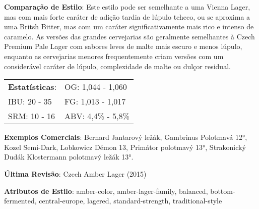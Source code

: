 \textbf{Comparação de Estilo}: Este estilo pode ser semelhante a uma Vienna Lager, mas com mais forte caráter de adição tardia de lúpulo tcheco, ou se aproxima a uma Britsh Bitter, mas com um caráter significativamente mais rico e intenso de caramelo. As versões das grandes cervejarias são geralmente semelhantes à Czech Premium Pale Lager com sabores leves de malte mais escuro e menos lúpulo, enquanto as cervejarias menores frequentemente criam versões com um considerável caráter de lúpulo, complexidade de malte ou dulçor residual.

\begin{tabular}{@{}p{35mm}p{35mm}@{}}
  \textbf{Estatísticas}: & OG: 1,044 - 1,060 \\
  IBU: 20 - 35  & FG: 1,013 - 1,017  \\
  SRM: 10 - 16   & ABV: 4,4\% - 5,8\%
\end{tabular}

\textbf{Exemplos Comerciais}: Bernard Jantarový ležák, Gambrinus Polotmavá 12°, Kozel Semi-Dark, Lobkowicz Démon 13, Primátor polotmavý 13°, Strakonický Dudák Klostermann polotmavý ležák 13°.

\textbf{Última Revisão}: Czech Amber Lager (2015)

\textbf{Atributos de Estilo}: amber-color, amber-lager-family, balanced, bottom-fermented, central-europe, lagered, standard-strength, traditional-style